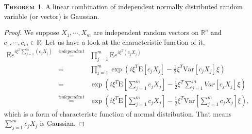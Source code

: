 \documentclass[a4paper, twoside, 11pt]{article}
\theoremstyle{definition}
\newtheorem{theorem}[definition]{\scshape Theorem}
\newtheorem{corollary}[definition]{\scshape Corollary}
\newcommand{\brkt}[1]{\left({#1} \right)}
\begin{document}

  


\begin{theorem}
  A linear combination of independent normally distributed random \\variable (or vector) is Gaussian.
\end{theorem}

\begin{proof}
  We suppose $X_1, \cdots, X_m$ are independent random vectors  on $\mathbb{R}^n$ and $c_1, \cdots, c_m \in \mathbb{R}$. Let us have a look at the characteristic function of it,
  \begin{eqnarray*}
	\mathrm{E}e^{i\xi^T\sum_{j=1}^m(c_jX_j)} &\overset{independent}{=}&\prod_{j=1}^{m} \mathrm{E}e^{i\xi^T(c_jX_j)}\\
	&=& \prod_{j=1}^m \exp\brkt{i\xi^T\mathrm{E}[c_jX_j]-\frac{1}{2}\xi^T\mathrm{Var}[c_jX_j]\xi}\\
	&=&  \exp\brkt{i\xi^T\mathrm{E}[\sum_{j=1}^{m}c_jX_j]-\frac{1}{2}\xi^T\mathrm\sum_{j=1}^{m}{Var}[c_jX_j]\xi}\\
	&\overset{independent}{=}&  \exp\brkt{i\xi^T\mathrm{E}[\sum_{j=1}^{m}c_jX_j]-\frac{1}{2}\xi^T\mathrm{Var}[\sum_{j=1}^{m}c_jX_j]\xi},
  \end{eqnarray*}
  which is a form of characteristc function of normal distribution. That means $\sum_{j=1}^m c_jX_j$ is Gaussian. 
\end{proof}
\end{document}
